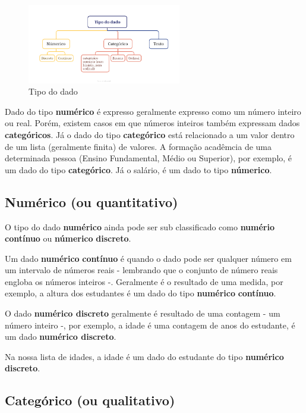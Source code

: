 \documentclass[
]{book}
\begin{document}
\begin{figure}
\centering
\includegraphics[width=2.64583in,height=\textheight]{figuras/tipo_dado.png}
\caption{Tipo do dado}
\end{figure}

Dado do tipo \textbf{numérico} é expresso geralmente expresso como um número inteiro ou real. Porém, existem casos em que números inteiros também expressam dados \textbf{categóricos}. Já o dado do tipo \textbf{categórico} está relacionado a um valor dentro de um lista (geralmente finita) de valores. A formação acadêmcia de uma determinada pessoa (Ensino Fundamental, Médio ou Superior), por exemplo, é um dado do tipo \textbf{categórico}. Já o salário, é um dado to tipo \textbf{númerico}.

\subsection{Numérico (ou quantitativo)}\label{numuxe9rico-ou-quantitativo}

O tipo do dado \textbf{numérico} ainda pode ser sub classificado como \textbf{numério} \textbf{contínuo} ou \textbf{númerico} \textbf{discreto}.

Um dado \textbf{numérico} \textbf{contínuo} é quando o dado pode ser qualquer número em um intervalo de números reais - lembrando que o conjunto de número reais engloba os números inteiros -. Geralmente é o resultado de uma medida, por exemplo, a altura dos estudantes é um dado do tipo \textbf{numérico} \textbf{contínuo}.

O dado \textbf{numérico discreto} geralmente é resultado de uma contagem - um número inteiro -, por exemplo, a idade é uma contagem de anos do estudante, é um dado \textbf{numérico discreto}.

Na nossa lista de idades, a idade é um dado do estudante do tipo \textbf{numérico discreto}.

\subsection{Categórico (ou qualitativo)}\label{categuxf3rico-ou-qualitativo}
\end{document}
